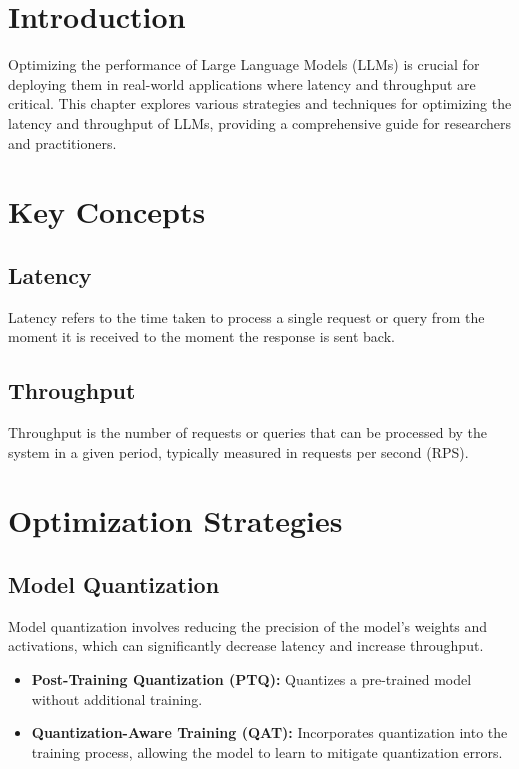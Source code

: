 \section{Introduction}
Optimizing the performance of Large Language Models (LLMs) is crucial for deploying them in real-world applications where latency and throughput are critical. This chapter explores various strategies and techniques for optimizing the latency and throughput of LLMs, providing a comprehensive guide for researchers and practitioners.

\section{Key Concepts}

\subsection{Latency}
Latency refers to the time taken to process a single request or query from the moment it is received to the moment the response is sent back.

\subsection{Throughput}
Throughput is the number of requests or queries that can be processed by the system in a given period, typically measured in requests per second (RPS).

\section{Optimization Strategies}

\subsection{Model Quantization}
Model quantization involves reducing the precision of the model's weights and activations, which can significantly decrease latency and increase throughput.

\begin{itemize}
    \item \textbf{Post-Training Quantization (PTQ):} Quantizes a pre-trained model without additional training.
    \item \textbf{Quantization-Aware Training (QAT):} Incorporates quantization into the training process, allowing the model to learn to mitigate quantization errors.
\end{itemize}

